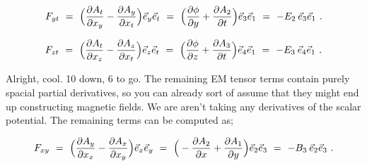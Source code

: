 \documentclass{article}
\begin{document}
\begin{equation} \label{eb-eq-1002-26}
F_{y t} \hspace{0.125cm} = \hspace{0.125cm}  \Big( \frac{\partial{A_{t}}}{\partial{x_{y}}} - \frac{\partial{A_{y}}}{\partial{x_{t}}} \Big) \vec{e}_{y} \vec{e}_{t} \hspace{0.125cm} = \hspace{0.125cm} \Big(  \frac{\partial{\phi}}{\partial{y}} + \frac{\partial{A_{2}}}{\partial{t}} \Big) \vec{e}_{3} \vec{e}_{1} \hspace{0.125cm} = \hspace{0.125cm} - E_2 \hspace{0.075cm} \vec{e}_{3} \vec{e}_{1} \hspace{0.125cm} .
\end{equation}

\begin{equation} \label{eb-eq-1002-27}
F_{z t} \hspace{0.125cm} = \hspace{0.125cm}  \Big( \frac{\partial{A_{t}}}{\partial{x_{z}}} - \frac{\partial{A_{z}}}{\partial{x_{t}}} \Big) \vec{e}_{z} \vec{e}_{t} \hspace{0.125cm} = \hspace{0.125cm} \Big( \frac{\partial{\phi}}{\partial{z}} + \frac{\partial{A_{3}}}{\partial{t}} \Big) \vec{e}_{4} \vec{e}_{1} \hspace{0.125cm} = \hspace{0.125cm} - E_3 \hspace{0.075cm} \vec{e}_{4} \vec{e}_{1} \hspace{0.125cm} .
\end{equation}

Alright, cool. 10 down, 6 to go. The remaining EM tensor terms contain purely spacial partial derivatives, so you can already sort of assume that they might end up constructing magnetic fields. We are aren't taking any derivatives of the scalar potential. The remaining terms can be computed as;

\begin{equation} \label{eb-eq-1002-28}
F_{x y} \hspace{0.125cm} = \hspace{0.125cm}  \Big( \frac{\partial{A_{y}}}{\partial{x_{x}}} - \frac{\partial{A_{x}}}{\partial{x_{y}}} \Big) \vec{e}_{x} \vec{e}_{y} \hspace{0.125cm} = \hspace{0.125cm} \Big( - \frac{\partial{A_{2}}}{\partial{x}} + \frac{\partial{A_{1}}}{\partial{y}} \Big) \vec{e}_{2} \vec{e}_{3} \hspace{0.125cm} = \hspace{0.125cm} - B_3 \hspace{0.075cm} \vec{e}_{2} \vec{e}_{3} \hspace{0.125cm} .
\end{equation}
\end{document}
